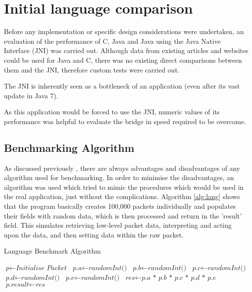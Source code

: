 \documentclass[final_report.tex]{subfiles}
\begin{document}
\section{Initial language comparison}
Before any implementation or specific design considerations were undertaken, an evaluation of the performance of C, Java and Java using the Java Native Interface (JNI) was carried out. Although data from existing articles and websites could be used for Java and C, there was no existing direct comparisons between them and the JNI, therefore custom tests were carried out.

The JNI is inherently  seen as a bottleneck of an application (even after its vast update in Java 7). 

As this application would be forced to use the JNI, numeric values of its performance was helpful to evaluate the bridge in speed required to be overcome.

\subsection{Benchmarking Algorithm}
As discussed previously , there are always advantages and disadvantages of any algorithm used for benchmarking. In order to minimise the disadvantages, an algorithm was used which tried to mimic the procedures which would be used in the real application, just without the complications. Algorithm \ref{alg:lang} shows that the program basically creates 100,000 packets individually and populates their fields with random data, which is then processed and return in the 'result' field. This simulates retrieving low-level packet data, interpreting and acting upon the data, and then setting data within the raw packet.

\begin{algorithm}[H]
	\caption{Language Benchmark Algorithm}\label{alg:lang}
	\begin{algorithmic}[1]
				\State $\textit{p} \gets \textit{Initialise Packet}$
				\State {}
				\State {}
			\EndFor
		\EndFunction
		\newline
		 
			\State $\textit{p.a} \gets \textit{randomInt()}$
			\State $\textit{p.b} \gets \textit{randomInt()}$
			\State $\textit{p.c} \gets \textit{randomInt()}$
			\State $\textit{p.d} \gets \textit{randomInt()}$
			\State $\textit{p.e} \gets \textit{randomInt()}$
		\EndFunction
		\newline
		 
			\State $\textit{res} \gets \textit{p.a * p.b * p.c * p.d * p.e}$
			\State $\textit{p.result} \gets \textit{res}$
		\EndFunction
	\end{algorithmic}
\end{algorithm}
\end{document}
